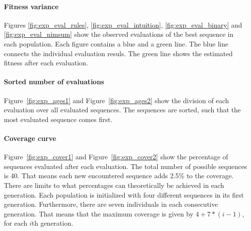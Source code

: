 \paragraph{Fitness variance}
Figures \ref{fig:exp_eval_rules}, \ref{fig:exp_eval_intuition},
\ref{fig:exp_eval_binary} and \ref{fig:exp_eval_nimsum} show the observed
evaluations of the best sequence in each population. Each figure contains a
blue and a green line. The blue line connects the individual evaluation resuls.
The green line shows the estimated fitness after each evaluation.
\paragraph{Sorted number of evaluations}
Figure~\ref{fig:exp_ages1} and Figure~\ref{fig:exp_ages2} show the division of
each evaluation over all evaluated sequences. The sequences are sorted, such
that the most evaluated sequence comes first.
\paragraph{Coverage curve}
Figure~\ref{fig:exp_cover1} and Figure~\ref{fig:exp_cover2} show the percentage
of sequences evaluated after each evaluation. The total number of possible
sequences is 40. That means each new encountered sequence adds 2.5\% to the
coverage. There are limits to what percentages can theoretically be achieved in
each generation. Each population is initialized with four different sequences
in its first generation. Furthermore, there are seven individuals in each
consecutive generation. That means that the maximum coverage is given by
$4+7*(i-1)$, for each $i$th generation.
